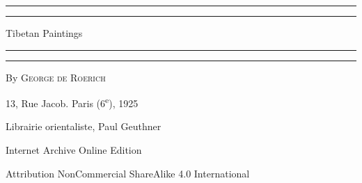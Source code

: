\documentclass[a4paper, 12pt, oneside]{article}
\begin{document}
\begin{titlepage} %
	\centering %
	\scshape %

	
	\rule{\textwidth}{1.6pt}\vspace*{-\baselineskip}\vspace*{2pt} %
	\rule{\textwidth}{0.4pt} %
	
	\vspace{0.75\baselineskip} %
	
	{\LARGE Tibetan Paintings} %
	
	\vspace{0.75\baselineskip} %
	
	\rule{\textwidth}{0.4pt}\vspace*{-\baselineskip}\vspace{3.2pt} %
	\rule{\textwidth}{1.6pt} %
	
	\vspace{1\baselineskip} %
	
	
	{By \scshape\Large George de Roerich} %
	
	\vspace*{1\baselineskip} %
	
	
	\vspace{1\baselineskip} %

	
	
		
	\vspace*{\fill}%
	
	13, Rue Jacob. Paris (6\textsuperscript{e}), 1925 %
	
	{\small Librairie orientaliste, Paul Geuthner } %

	\vspace{1\baselineskip} %

    Internet Archive Online Edition  %
	
	{\small Attribution NonCommercial ShareAlike 4.0 International } %
\end{titlepage}
\end{document}
